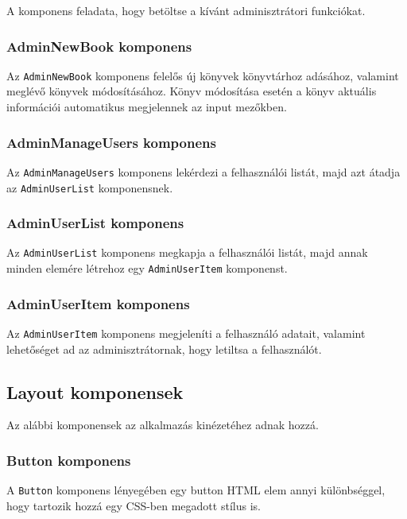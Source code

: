 A komponens feladata, hogy betöltse a kívánt adminisztrátori funkciókat.

\subsubsection{AdminNewBook komponens}

Az \texttt{AdminNewBook} komponens felelős új könyvek könyvtárhoz adásához, valamint meglévő könyvek módosításához. Könyv módosítása esetén a könyv aktuális információi automatikus megjelennek az input mezőkben.

\subsubsection{AdminManageUsers komponens}

Az \texttt{AdminManageUsers} komponens lekérdezi a felhasználói listát, majd azt átadja az \texttt{AdminUserList} komponensnek.

\subsubsection{AdminUserList komponens}

Az \texttt{AdminUserList} komponens megkapja a felhasználói listát, majd annak minden elemére létrehoz egy \texttt{AdminUserItem} komponenst.

\subsubsection{AdminUserItem komponens}

Az \texttt{AdminUserItem} komponens megjeleníti a felhasználó adatait, valamint lehetőséget ad az adminisztrátornak, hogy letiltsa a felhasználót.

\subsection{Layout komponensek}

Az alábbi komponensek az alkalmazás kinézetéhez adnak hozzá.

\subsubsection{Button komponens}

A \texttt{Button} komponens lényegében egy button HTML elem annyi különbséggel, hogy tartozik hozzá egy CSS-ben megadott stílus is.

